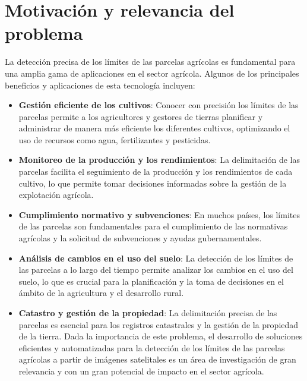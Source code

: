 \section{Motivación y relevancia del problema}
La detección precisa de los límites de las parcelas agrícolas es fundamental para una amplia gama de aplicaciones en el sector agrícola. Algunos de los principales beneficios y aplicaciones de esta tecnología incluyen:

\begin{itemize}
	\item\textbf{Gestión eficiente de los cultivos}: Conocer con precisión los límites de las parcelas permite a los agricultores y gestores de tierras planificar y administrar de manera más eficiente los diferentes cultivos, optimizando el uso de recursos como agua, fertilizantes y pesticidas.

	\item\textbf{Monitoreo de la producción y los rendimientos}: La delimitación de las parcelas facilita el seguimiento de la producción y los rendimientos de cada cultivo, lo que permite tomar decisiones informadas sobre la gestión de la explotación agrícola.

	\item\textbf{Cumplimiento normativo y subvenciones}: En muchos países, los límites de las parcelas son fundamentales para el cumplimiento de las normativas agrícolas y la solicitud de subvenciones y ayudas gubernamentales.

	\item\textbf{Análisis de cambios en el uso del suelo}: La detección de los límites de las parcelas a lo largo del tiempo permite analizar los cambios en el uso del suelo, lo que es crucial para la planificación y la toma de decisiones en el ámbito de la agricultura y el desarrollo rural.

	\item\textbf{Catastro y gestión de la propiedad}: La delimitación precisa de las parcelas es esencial para los registros catastrales y la gestión de la propiedad de la tierra.
	Dada la importancia de este problema, el desarrollo de soluciones eficientes y automatizadas para la detección de los límites de las parcelas agrícolas a partir de imágenes satelitales es un área de investigación de gran relevancia y con un gran potencial de impacto en el sector agrícola.
	
\end{itemize}

